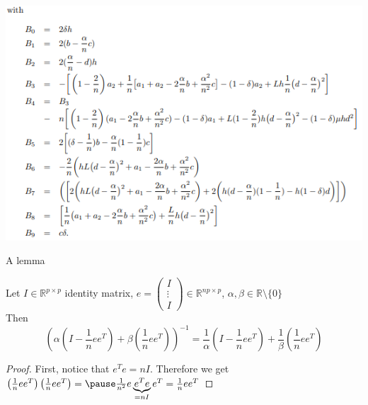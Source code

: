 \documentclass{beamer}
\numberwithin{equation}{aufgabe}
\newcommand\R{\mathbb R}
\begin{document}
\begin{frame}
    \includegraphics[width=\textwidth]{images/terms.png}
\end{frame}

\begin{frame}{A lemma}
    \begin{lemma}[2]
        Let $I\in \R^{p\times p}$ identity matrix, $e = \begin{pmatrix}I \\ \vdots \\ I\end{pmatrix}\in \R^{np \times p}$, $\alpha, \beta \in \R \setminus \{0\}$\\
        Then\pause
        $$ \left( \alpha \left( I - \frac{1}{n} ee^T \right) + \beta \left( \frac{1}{n} ee^T\right) \right)^{-1} = \frac{1}{\alpha} \left( I-\frac{1}{n} ee^T \right) + \frac{1}{\beta} \left( \frac{1}{n} ee^T \right) $$
    \end{lemma}\pause
    \begin{proof}
        First, notice that $e^Te = nI$. \pause Therefore we get $\left( \frac{1}{n} ee^T \right) \left( \frac{1}{n} ee^T \right) = \pause \frac{1}{n^2}e\underbrace{e^Te}_{=nI}e^T = \frac{1}{n} ee^T$ 
    \end{proof}
\end{frame}
\end{document}
